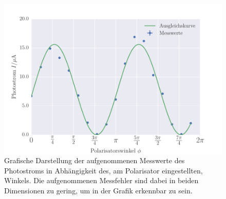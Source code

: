 \begin{figure}[!h]
 \centering
 \includegraphics[scale=0.75]{../Grafiken/Polarisation.pdf}
 \caption{Grafische Darstellung der aufgenommenen Messwerte des Photostroms in Abhängigkeit des, am Polarisator eingestellten, Winkels. Die aufgenommenen Messfehler sind dabei in beiden 
 Dimensionen zu gering, um in der Grafik erkennbar zu sein.\label{fig:polarisation}}
 \end{figure} 